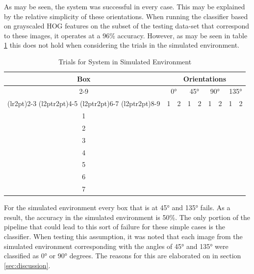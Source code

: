 \documentclass[letterpaper, 10 pt, conference]{conf/ieeeconf}  %
\newcommand{\cmark}{\ding{51}}%
\newcommand{\xmark}{\ding{55}}%
\begin{document}
As may be seen, the system was successful in every case. This may be explained
by the relative simplicity of these orientations. When running the classifier
based on grayscaled HOG features on the subset of the testing data-set that
correspond to these images, it operates at a 96\% accuracy. However, as may be
seen in table \ref{tab:trials_simulated} this does not hold when considering the
trials in the simulated environment.

\begin{table}[H]
  \centering
  \begin{tabular}{c c c c c c c c c}
    \toprule
    \multirow{4}{*}[-0.5\dimexpr \aboverulesep + \belowrulesep + \cmidrulewidth]{Box} & \multicolumn{8}{c}{Orientations}\\
    \cmidrule(rl){2-9}
                                                                                      & \multicolumn{2}{c}{\ang{0}} & \multicolumn{2}{c}{\ang{45}} & \multicolumn{2}{c}{\ang{90}} & \multicolumn{2}{c}{\ang{135}} \\
    \cmidrule(lr{2pt}){2-3}
    \cmidrule(l{2pt}r{2pt}){4-5}
    \cmidrule(l{2pt}r{2pt}){6-7}
    \cmidrule(l{2pt}r{2pt}){8-9}
                                                                                      & 1      & 2      & 1      & 2      &  1     & 2      &  1     &  2    \\
    \midrule
    1 & \cmark & \cmark & \xmark & \xmark & \cmark & \cmark & \xmark & \xmark \\
    2 & \cmark & \cmark & \xmark & \xmark & \cmark & \cmark & \xmark & \xmark \\
    3 & \cmark & \cmark & \xmark & \xmark & \cmark & \cmark & \xmark & \xmark \\
    4 & \cmark & \cmark & \xmark & \xmark & \cmark & \cmark & \xmark & \xmark \\
    5 & \cmark & \cmark & \xmark & \xmark & \cmark & \cmark & \xmark & \xmark \\
    6 & \cmark & \cmark & \xmark & \xmark & \cmark & \cmark & \xmark & \xmark \\
    7 & \cmark & \cmark & \xmark & \xmark & \cmark & \cmark & \xmark & \xmark \\
    \bottomrule
  \end{tabular}
  \caption{Trials for System in Simulated Environment}
  \label{tab:trials_simulated}
\end{table}

For the simulated environment every box that is at \ang{45} and \ang{135} fails.
As a result, the accuracy in the simulated environment is 50\%. The only portion
of the pipeline that could lead to this sort of failure for these simple cases
is the classifier. When testing this assumption, it was noted that each image
from the simulated environment corresponding with the angles of \ang{45} and
\ang{135} were classified as \ang{0} or \ang{90} degrees. The reasons for this
are elaborated on in section \ref{sec:discussion}.
\end{document}
